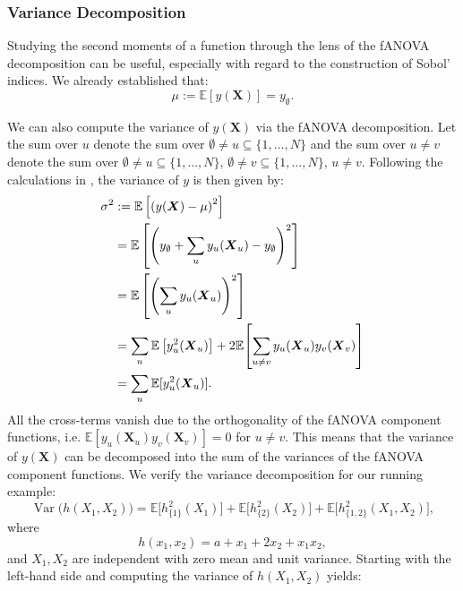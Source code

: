 \subsubsection{Variance Decomposition}
Studying the second moments of  a function through the lens of the fANOVA decomposition can be useful, especially with regard to the construction of Sobol' indices. We already established that:
$$ \mu := \mathbb{E}[y(\boldsymbol{X})] = y_{\emptyset}.$$

We can also compute the variance of $y(\boldsymbol{X})$ via the fANOVA decomposition.
Let the sum over $u$ denote the sum over $\emptyset \neq u \subseteq \{1, \dots, N\}$ and the sum over $u \neq v$ denote the sum over $\emptyset \neq u \subseteq \{1, \dots, N\}, \, \emptyset \neq v \subseteq \{1, \dots, N\}, \, u \neq v$.
Following the calculations in \cite{rahman2014}, the variance of $y$ is then given by:
\begin{align}\label{eq:variance_decomposition_classical}
\sigma^2 
&:= \mathbb{E}\left[ \left( y(\boldsymbol{X}) - \mu \right)^2 \right] \notag \\
&= \mathbb{E} \left[ \left( y_{\emptyset} + \sum_{u} y_{u}(\boldsymbol{X}_u) - y_{\emptyset} \right)^2 \right] \notag \\
&= \mathbb{E} \left[ \left( \sum_{u} y_{u}(\boldsymbol{X}_u) \right)^2 \right] \notag \\
&= \sum_{u} \mathbb{E} \left[ y_{u}^2(\boldsymbol{X}_u) \right]
 + 2 \mathbb{E}\!\left[\sum_{u \neq v} y_u({\boldsymbol{X}_u}) y_v({\boldsymbol{X}_v})\right] \notag \\ 
& = \sum_{u} \mathbb{E}[y_u^2({\boldsymbol{X}_u})].
\end{align}
All the cross-terms vanish due to the orthogonality of the fANOVA component functions, i.e. $\mathbb{E}[y_u({\boldsymbol{X}_u})  y_v({\boldsymbol{X}_v})] = 0$ for $u \neq v$.
This means that the variance of $y(\boldsymbol{X})$ can be decomposed into the sum of the variances of the fANOVA component functions.
We verify the variance decomposition for our running example:
\[
  \operatorname{Var}\big(h(X_1,X_2)\big)
  = \mathbb{E}\!\big[h_{\{1\}}^2(X_1)\big]
  + \mathbb{E}\!\big[h_{\{2\}}^2(X_2)\big]
  + \mathbb{E}\!\big[h_{\{1,2\}}^2(X_1,X_2)\big],
\]
where 
\[
  h(x_1,x_2) = a + x_1 + 2x_2 + x_1x_2,
\]
and $X_1,X_2$ are independent with zero mean and unit variance.
Starting with the left-hand side and computing the variance of $h(X_1,X_2)$ yields:
